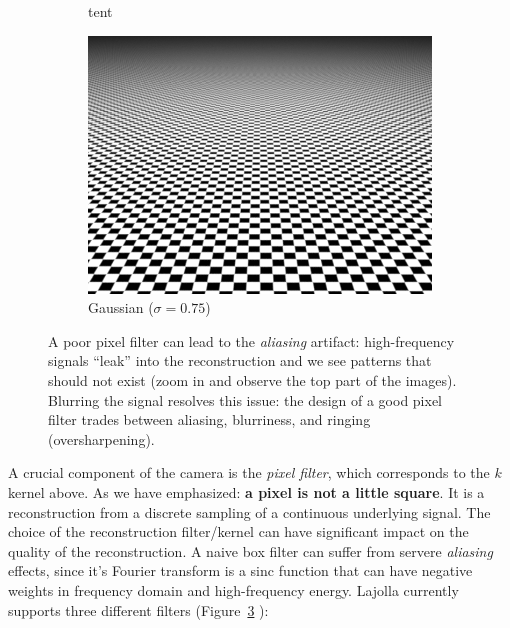 \documentclass{article}
\begin{document}
\begin{figure}
\begin{subfigure}[t]{0.32\linewidth}
        \caption{tent}
        \label{fig:tent_filter}
    \end{subfigure}
    \begin{subfigure}[t]{0.32\linewidth}
        \centering
        \includegraphics[width=\textwidth]{imgs/gaussian.png}
        \caption{Gaussian ($\sigma = 0.75$)}
        \label{fig:gaussian_filter}
    \end{subfigure}
    \caption{A poor pixel filter can lead to the \emph{aliasing} artifact: high-frequency signals ``leak'' into the reconstruction and we see patterns that should not exist (zoom in and observe the top part of the images). Blurring the signal resolves this issue: the design of a good pixel filter trades between aliasing, blurriness, and ringing (oversharpening).\protect\footnotemark}
    \label{fig:pixel_filter_comp}
\end{figure}

A crucial component of the camera is the \emph{pixel filter}, which corresponds to the $k$ kernel above. As we have emphasized: \textbf{a pixel is not a little square}. It is a reconstruction from a discrete sampling of a continuous underlying signal. The choice of the reconstruction filter/kernel can have significant impact on the quality of the reconstruction. A naive box filter can suffer from servere \emph{aliasing} effects, since it's Fourier transform is a sinc function that can have negative weights in frequency domain and high-frequency energy. Lajolla currently supports three different filters (Figure~\ref{fig:pixel_filter_comp} ):
\end{document}

